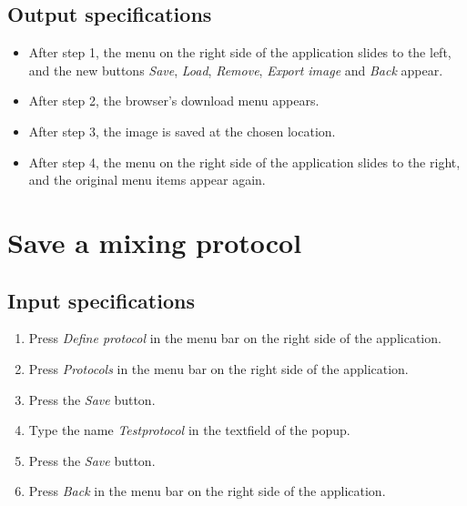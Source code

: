 \subsection*{Output specifications}
\begin{itemize}
\item After step 1, the menu on the right side of the application slides to the left, and the new buttons \emph{Save}, \emph{Load}, \emph{Remove}, \emph{Export image} and \emph{Back} appear.
\item After step 2, the browser's download menu appears.
\item After step 3, the image is saved at the chosen location.
\item After step 4, the menu on the right side of the application slides to the right, and the original menu items appear again.
\end{itemize}

\section{Save a mixing protocol}

\subsection*{Input specifications}
\begin{enumerate}
\item Press \emph{Define protocol} in the menu bar on the right side of the application.
\item Press \emph{Protocols} in the menu bar on the right side of the application.
\item Press the \emph{Save} button.
\item Type the name \emph{Testprotocol} in the textfield of the popup.
\item Press the \emph{Save} button.
\item Press \emph{Back} in the menu bar on the right side of the application.
\end{enumerate}

